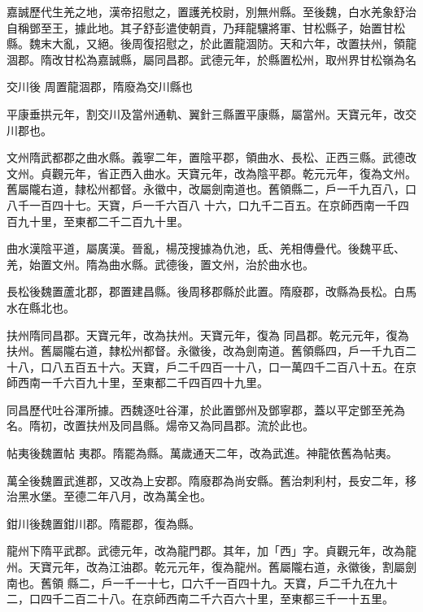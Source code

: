 \begin{pinyinscope}
 嘉誠歷代生羌之地，漢帝招慰之，置護羌校尉，別無州縣。至後魏，白水羌象舒治自稱鄧至王，據此地。其子舒彭遣使朝貢，乃拜龍驤將軍、甘松縣子，始置甘松縣。魏末大亂，又絕。後周復招慰之，於此置龍涸防。天和六年，改置扶州，領龍涸郡。隋改甘松為嘉誠縣，屬同昌郡。武德元年，於縣置松州，取州界甘松嶺為名



 交川後
 周置龍涸郡，隋廢為交川縣也



 平康垂拱元年，割交川及當州通軌、翼針三縣置平康縣，屬當州。天寶元年，改交川郡也。



 文州隋武都郡之曲水縣。義寧二年，置陰平郡，領曲水、長松、正西三縣。武德改文州。貞觀元年，省正西入曲水。天寶元年，改為陰平郡。乾元元年，復為文州。舊屬隴右道，隸松州都督。永徽中，改屬劍南道也。舊領縣二，戶一千九百八，口八千一百四十七。天寶，戶一千六百八
 十六，口九千二百五。在京師西南一千四百九十里，至東都二千二百九十里。



 曲水漢陰平道，屬廣漢。晉亂，楊茂搜據為仇池，氐、羌相傳疊代。後魏平氐、羌，始置文州。隋為曲水縣。武德後，置文州，治於曲水也。



 長松後魏置蘆北郡，郡置建昌縣。後周移郡縣於此置。隋廢郡，改縣為長松。白馬水在縣北也。



 扶州隋同昌郡。天寶元年，改為扶州。天寶元年，復為
 同昌郡。乾元元年，復為扶州。舊屬隴右道，隸松州都督。永徽後，改為劍南道。舊領縣四，戶一千九百二十八，口八五百五十六。天寶，戶二千四百一十八，口一萬四千二百八十五。在京師西南一千六百九十里，至東都二千四百四十九里。



 同昌歷代吐谷渾所據。西魏逐吐谷渾，於此置鄧州及鄧寧郡，蓋以平定鄧至羌為名。隋初，改置扶州及同昌縣。煬帝又為同昌郡。流於此也。



 帖夷後魏置帖
 夷郡。隋罷為縣。萬歲通天二年，改為武進。神龍依舊為帖夷。



 萬全後魏置武進郡，又改為上安郡。隋廢郡為尚安縣。舊治刺利村，長安二年，移治黑水堡。至德二年八月，改為萬全也。



 鉗川後魏置鉗川郡。隋罷郡，復為縣。



 龍州下隋平武郡。武德元年，改為龍門郡。其年，加「西」字。貞觀元年，改為龍州。天寶元年，改為江油郡。乾元元年，復為龍州。舊屬隴右道，永徽後，割屬劍南也。舊領
 縣二，戶一千一十七，口六千一百四十九。天寶，戶二千九在九十二，口四千二百二十八。在京師西南二千六百六十里，至東都三千一十五里。




\end{pinyinscope}
